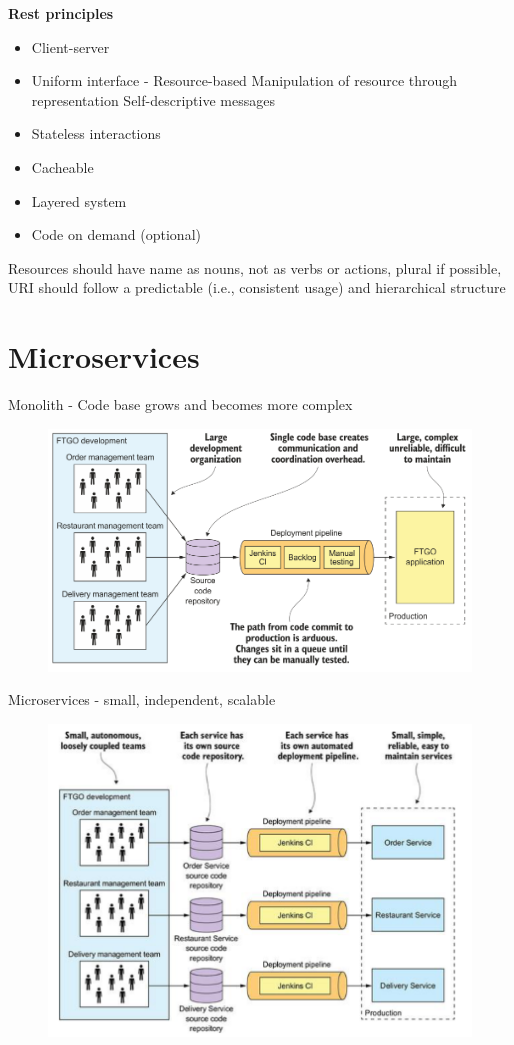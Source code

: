 \textbf{Rest principles}

\begin{itemize}
    \item Client-server
    \item Uniform interface - Resource-based Manipulation of resource through representation Self-descriptive messages
    \item Stateless interactions
    \item Cacheable
    \item Layered system
    \item Code on demand (optional) 
\end{itemize}

Resources should have name as nouns, not as verbs or actions, plural if possible, URI should follow a predictable (i.e., consistent usage) and hierarchical structure
\pagebreak
\section{Microservices}
Monolith - Code base grows and becomes more complex
\begin{figure}[ht!]
\centering
\includegraphics[width=.75\textwidth]{oborove/SWA/img/monolith.png}
\end{figure}

Microservices - small, independent, scalable
\begin{figure}[ht!]
\centering
\includegraphics[width=.75\textwidth]{oborove/SWA/img/microservice.png}
\end{figure}

